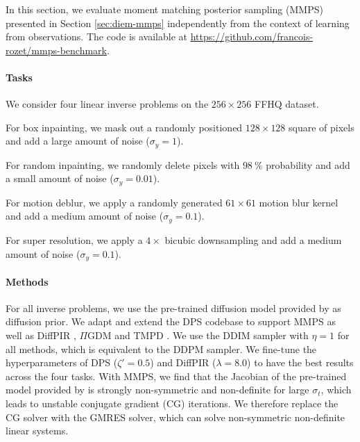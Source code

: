 \begin{subappendices}
In this section, we evaluate moment matching posterior sampling (MMPS) presented in Section \ref{sec:diem-mmps} independently from the context of learning from observations. The code is available at \url{https://github.com/francois-rozet/mmps-benchmark}.

\paragraph{Tasks} We consider four linear inverse problems on the $256 \times 256$ FFHQ \cite{karras2019stylebased} dataset.
\begin{enumerate*}[label=(\roman*)]
    \item For box inpainting, we mask out a randomly positioned $128 \times 128$ square of pixels and add a large amount of noise ($\sigma_y = 1$).
    \item For random inpainting, we randomly delete pixels with $\qty{98}{\percent}$ probability and add a small amount of noise ($\sigma_y = 0.01$).
    \item For motion deblur, we apply a randomly generated $61 \times 61$ motion blur kernel and add a medium amount of noise ($\sigma_y = 0.1$).
    \item For super resolution, we apply a $4 \times$ bicubic downsampling and add a medium amount of noise ($\sigma_y = 0.1$).
\end{enumerate*}

\paragraph{Methods} For all inverse problems, we use the pre-trained diffusion model provided by \textcite{chung2023diffusion} as diffusion prior. We adapt and extend the DPS \cite{chung2023diffusion} codebase to support MMPS as well as DiffPIR \cite{zhu2023denoising}, $\Pi$GDM \cite{song2023pseudoinverseguided} and TMPD \cite{boys2023tweedie}. We use the DDIM \cite{song2021denoising} sampler with $\eta = 1$ for all methods, which is equivalent to the DDPM \cite{ho2020denoising} sampler. We fine-tune the hyperparameters of DPS ($\zeta' = 0.5$) and DiffPIR ($\lambda = 8.0$) to have the best results across the four tasks. With MMPS, we find that the Jacobian of the pre-trained model provided by \textcite{chung2023diffusion} is strongly non-symmetric and non-definite for large $\sigma_t$, which leads to unstable conjugate gradient (CG) \cite{hestenes1952methods} iterations. We therefore replace the CG solver with the GMRES \cite{saad1986gmres} solver, which can solve non-symmetric non-definite linear systems.


\end{subappendices}
